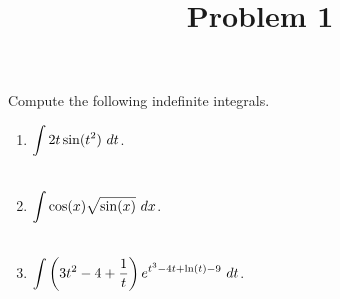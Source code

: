 \documentclass{ximera}
\title[Problem 1]{Problem 1}
\begin{document}
\begin{abstract} \end{abstract}
\maketitle

\begin{problem}
	Compute the following indefinite integrals.
	\begin{enumerate}
		\item $\displaystyle \int 2t \sin(t^2) \, \,d t$.\\ \\
			\item $\displaystyle \int \cos(x) \sqrt{\sin(x)} \, \,d x$.\\ \\
	\item $\displaystyle \int \left( 3t^2-4+\dfrac{1}{t} \right) e^{t^3-4t+\ln(t)-9}\, \,d t$.
	\end{enumerate}
	
\end{problem}
\end{document}
